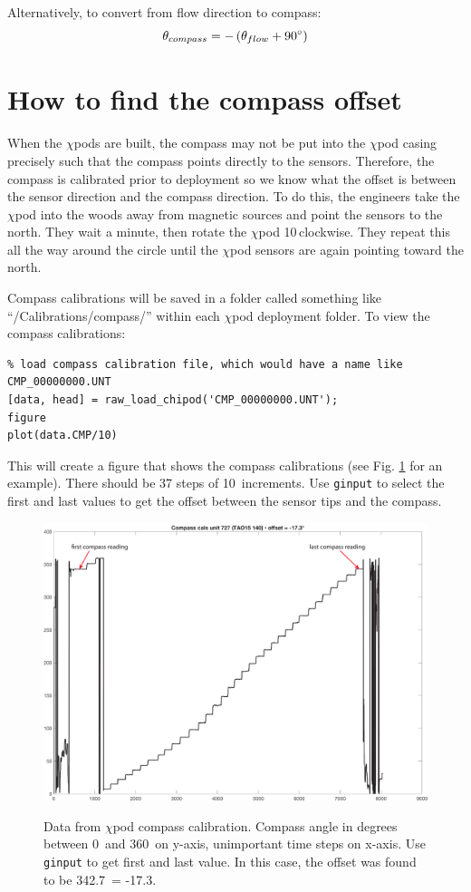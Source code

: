 Alternatively, to convert from flow direction to compass:
\begin{equation}
\theta_{compass} = -\left(\theta_{flow} + 90\degree\right)
\end{equation}

\section{How to find the compass offset}
When the $\chi$pods are built, the compass may not be put into the $\chi$pod casing precisely such that the compass points directly to the sensors. Therefore, the compass is calibrated prior to deployment so we know what the offset is between the sensor direction and the compass direction. To do this, the engineers take the $\chi$pod into the woods away from magnetic sources and point the sensors to the north. They wait a minute, then rotate the $\chi$pod 10\degree \,clockwise. They repeat this all the way around the circle until the $\chi$pod sensors are again pointing toward the north.

Compass calibrations will be saved in a folder called something like ``/Calibrations/compass/'' within each $\chi$pod deployment folder. To view the compass calibrations:

\begin{verbatim}
% load compass calibration file, which would have a name like CMP_00000000.UNT
[data, head] = raw_load_chipod('CMP_00000000.UNT');
figure
plot(data.CMP/10)
\end{verbatim}

This will create a figure that shows the compass calibrations (see Fig. \ref{fig:compasscals} for an example). There should be 37 steps of 10\degree \, increments. Use \texttt{ginput} to select the first and last values to get the offset between the sensor tips and the compass.

\begin{figure}[h]
  \centering \centering\noindent\includegraphics[width=12.5cm,angle=0]{./figs/compass_cals_727.pdf}\\
    \caption{Data from $\chi$pod compass calibration. Compass angle in degrees between 0\degree \, and 360\degree \, on y-axis, unimportant time steps on x-axis. Use \texttt{ginput} to get first and last value. In this case, the offset was found to be 342.7\degree \, = -17.3\degree.}\label{fig:compasscals}
\end{figure}


